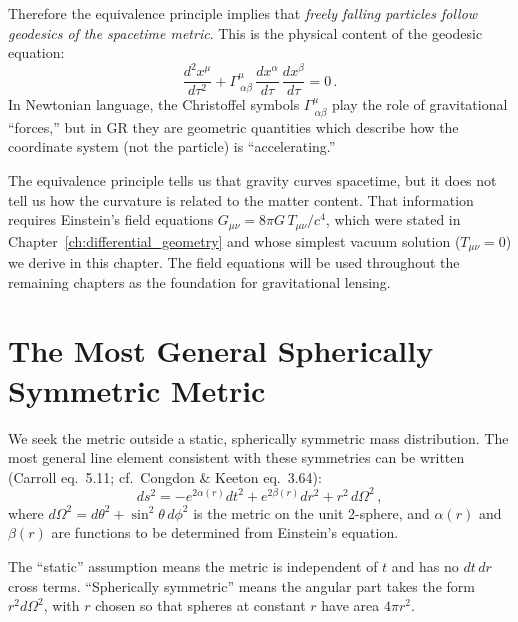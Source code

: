 Therefore the equivalence principle implies that \emph{freely
falling particles follow geodesics of the spacetime metric}.  This
is the physical content of the geodesic equation:
\begin{equation}
    \frac{d^2 x^\mu}{d\tau^2}
    + \Gamma^\mu_{\ \alpha\beta}\,
    \frac{dx^\alpha}{d\tau}\,\frac{dx^\beta}{d\tau} = 0 \,.
    \label{eq:geodesic_ep}
\end{equation}
In Newtonian language, the Christoffel symbols $\Gamma^\mu_{\ \alpha\beta}$
play the role of gravitational ``forces,'' but in GR they are
geometric quantities which describe how the coordinate system
(not the particle) is ``accelerating.''

\begin{remark}
The equivalence principle tells us that gravity curves
spacetime, but it does not tell us how the curvature is
related to the matter content.  That information requires Einstein's
field equations $G_{\mu\nu} = 8\pi G\, T_{\mu\nu}/c^4$, which were
stated in Chapter~\ref{ch:differential_geometry} and whose simplest vacuum solution ($T_{\mu\nu} = 0$)
we derive in this chapter.  The field equations will be used throughout
the remaining chapters as the foundation for gravitational lensing.
\end{remark}


\section{The Most General Spherically Symmetric Metric}
\label{sec:general_spherical}

We seek the metric outside a static, spherically symmetric mass
distribution.  The most general line element consistent with these
symmetries can be written (Carroll eq.~5.11; cf.\ Congdon \& Keeton
eq.~3.64):
\begin{equation}
    ds^2 = -e^{2\alpha(r)} dt^2 + e^{2\beta(r)} dr^2 + r^2\, d\Omega^2 \,,
    \label{eq:general_spherical}
\end{equation}
where $d\Omega^2 = d\theta^2 + \sin^2\theta\, d\phi^2$ is the metric on
the unit 2-sphere, and $\alpha(r)$ and $\beta(r)$ are functions to be
determined from Einstein's equation.

\begin{remark}
The ``static'' assumption means the metric is independent of $t$ and
has no $dt\,dr$ cross terms.  ``Spherically symmetric'' means the angular
part takes the form $r^2 d\Omega^2$, with $r$ chosen so that spheres at
constant $r$ have area $4\pi r^2$.
\end{remark}


